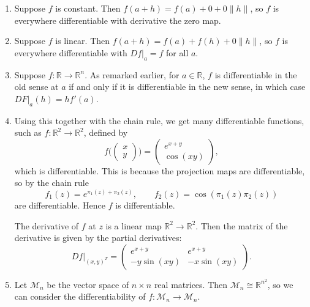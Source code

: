 \documentclass[12pt]{article}
\begin{document}
\begin{exbox}
	\begin{enumerate}[1.]
		\item Suppose $f$ is constant. Then $f(a+h) = f(a) + 0 + 0 \|h\|$, so $f$ is everywhere differentiable with derivative the zero map.
		\item Suppose $f$ is linear. Then $f(a+h) = f(a) + f(h) + 0\|h\|$, so $f$ is everywhere differentiable with $Df|_a = f$ for all $a$.
		\item Suppose $f : \mathbb{R} \to \mathbb{R}^{n}$. As remarked earlier, for $a \in \mathbb{R}$, $f$ is differentiable in the old sense at $a$ if and only if it is differentiable in the new sense, in which case $DF|_a(h) = h f'(a)$.
		\item Using this together with the chain rule, we get many differentiable functions, such as $f : \mathbb{R}^2 \to \mathbb{R}^2$, defined by
			\[
			f \biggl(
				\begin{pmatrix}
					x \\
					y
				\end{pmatrix}
				\biggr)=
				\begin{pmatrix}
					e^{x+y} \\
					\cos(xy)
				\end{pmatrix}
			,\]
			which is differentiable. This is because the projection maps are differentiable, so by the chain rule
			\[
			f_1(z) = e^{\pi_1(z) + \pi_2(z)}, \qquad f_2(z) = \cos(\pi_1(z)\pi_2(z))
			\]
			are differentiable. Hence $f$ is differentiable.

			The derivative of $f$ at $z$ is a linear map $\mathbb{R}^2 \to \mathbb{R}^2$. Then the matrix of the derivative is given by the partial derivatives:
			\[
				Df|_{(x, y)^{T}} =
				\begin{pmatrix}
					e^{x+y} & e^{x + y} \\
					-y \sin (xy) & -x \sin (xy)
				\end{pmatrix}
			.\]
		\item Let $\mathcal{M}_n$ be the vector space of $n \times n$ real matrices. Then $\mathcal{M}_n \cong \mathbb{R}^{n^2}$, so we can consider the differentiability of $f : \mathcal{M}_n \to \mathcal{M}_n$.


\end{enumerate}
\end{exbox}
\end{document}
